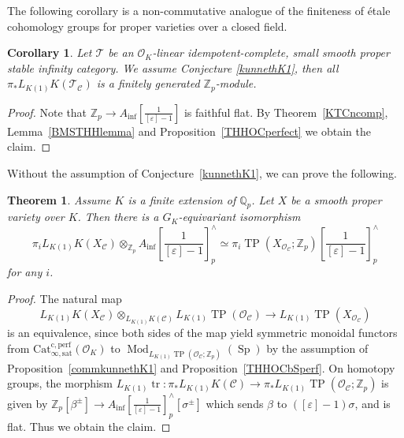 \documentclass[11pt]{amsart}
\newcommand{\Q}{\mathbb{Q}}
\newcommand{\Z}{\mathbb{Z}}
\newcommand{\sO}{\mathcal{O}}
\newcommand{\sT}{\mathcal{T}}
\newcommand{\Mod}{\operatorname{Mod}}
\newcommand{\LK}{{L_{K(1)}}}
\newcommand{\TP}{\operatorname{TP}}
\newcommand{\tr}{{\operatorname{tr}}}
\renewcommand{\epsilon}{\varepsilon}
\newcommand{\Ainf}{A_{\operatorname{inf}}}
\newcommand{\Cu}{\mathcal{C}}
\newcommand{\Catcsat}{\operatorname{Cat_{\infty,sat}^{c,perf}}}
\newcommand{\Sp}{\operatorname{Sp}}
\newtheorem{thm}[lemma]{Theorem}
\newtheorem{cor}[lemma]{Corollary}
\theoremstyle{definition}
\theoremstyle{remark}
\numberwithin{equation}{section}
\begin{document}
The following corollary is a non-commutative analogue of the finiteness of \'etale cohomology groups for proper varieties over a closed field.
\begin{cor}
Let $\sT$ be an $\sO_K$-linear idempotent-complete, small smooth proper stable infinity category. We assume Conjecture \ref{kunnethK1}, then all $\pi_*\LK K(\sT_\Cu)$ is a finitely generated $\Z_p$-module.
\end{cor}
\begin{proof}
Note that $\Z_p \to \Ainf[\frac{1}{[\epsilon]-1}]$ is faithful flat. By Theorem~\ref{KTCncomp}, Lemma~\ref{BMSTHHlemma} and Proposition~\ref{THHOCperfect} we obtain the claim. 
\end{proof}

Without the assumption of Conjecture~\ref{kunnethK1}, we can prove the following.
\begin{thm}\label{KTPcompcommutative}
  Assume $K$ is a finite extension of $\Q_p$. Let $X$ be a smooth proper variety over $K$. Then there is a $G_K$-equivariant isomorphism
\[
\pi_i \LK K(X_\Cu) \otimes_{\Z_p} \Ainf[\frac{1}{[\epsilon]-1}]^{\wedge}_p \simeq \pi_i \TP(X_{\sO_\Cu};\Z_p)[\frac{1}{[\epsilon]-1}]^{\wedge}_p
\]
for any $i$.
\end{thm}
\begin{proof}
  The natural map
  \[
  \LK K(X_\Cu)\otimes_{\LK K(\Cu)} \LK \TP(\sO_\Cu) \to \LK \TP(X_{\sO_\Cu})
  \]
  is an equivalence, since both sides of the map yield symmetric monoidal functors from $\Catcsat(\sO_K)$ to $\Mod_{\LK\TP(\sO_\Cu;\Z_p)}(\Sp)$ by the assumption of Proposition~\ref{commkunnethK1} and Proposition~\ref{THHOCbSperf}. On homotopy groups, the morphism $\LK \tr :\pi_*\LK K(\Cu)\to \pi_*\LK\TP(\sO_\Cu;\Z_p)$ is given by $\Z_p[\beta^{\pm}] \to \Ainf[\frac{1}{[\epsilon]-1}]^{\wedge}_p[\sigma^{\pm}]$ which sends $\beta$ to $([\epsilon]-1)\sigma$, and is flat. Thus we obtain the claim.
\end{proof}
\end{document}
